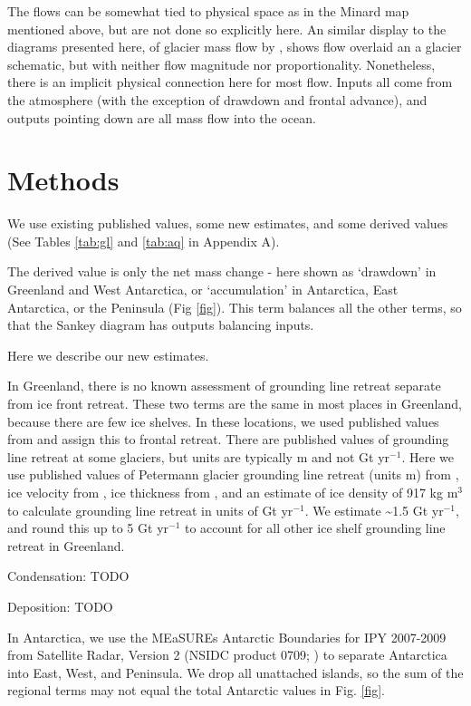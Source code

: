 \documentclass[jog]{igs}
\begin{document}
  The flows can be somewhat tied to physical space as in the Minard map mentioned above, but are not done so explicitly here. An similar display to the diagrams presented here, of glacier mass flow by \citet[Fig. 2]{cogley_2011}, shows flow overlaid an a glacier schematic, but with neither flow magnitude nor proportionality. Nonetheless, there is an implicit physical connection here for most flow. Inputs all come from the atmosphere (with the exception of drawdown and frontal advance), and outputs pointing down are all mass flow into the ocean.

\section{Methods}

We use existing published values, some new estimates, and some derived values (See Tables \ref{tab:gl} and \ref{tab:aq} in Appendix A).

The derived value is only the net mass change - here shown as `drawdown' in Greenland and West Antarctica, or `accumulation' in Antarctica, East Antarctica, or the Peninsula (Fig \ref{fig}). This term balances all the other terms, so that the Sankey diagram has outputs balancing inputs.

Here we describe our new estimates.

In Greenland, there is no known assessment of grounding line retreat separate from ice front retreat. These two terms are the same in most places in Greenland, because there are few ice shelves. In these locations, we used published values from \citet{kochtitzky_2023} and assign this to frontal retreat. There are published values of grounding line retreat at some glaciers, but units are typically m and not Gt yr$^{-1}$. Here we use published values of Petermann glacier grounding line retreat (units m) from \citet{millan_2022}, ice velocity from \citet{millan_2022}, ice thickness from \citet{ciraci_2023}, and an estimate of ice density of 917 kg m$^{3}$ to calculate grounding line retreat in units of Gt yr$^{-1}$. We estimate \sim 1.5 Gt yr$^{-1}$, and round this up to 5 Gt yr$^{-1}$ to account for all other ice shelf grounding line retreat in Greenland.

Condensation: TODO

Deposition: TODO

In Antarctica, we use the MEaSUREs Antarctic Boundaries for IPY 2007-2009 from Satellite Radar, Version 2 (NSIDC product 0709; \citet{mouginot_2017,rignot_2013}) to separate Antarctica into East, West, and Peninsula. We drop all unattached islands, so the sum of the regional terms may not equal the total Antarctic values in Fig. \ref{fig}.
\end{document}
